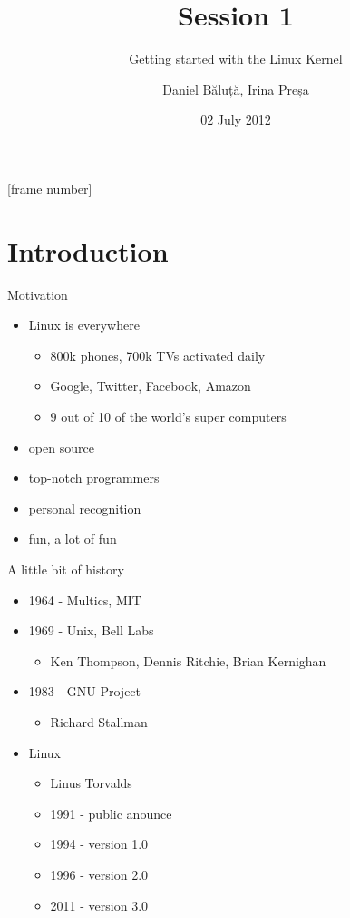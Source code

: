 \documentclass{workshop}
\title[Sesssion 1]{Session 1}
\subtitle{Getting started with the Linux Kernel}
\author{Daniel Băluță, Irina Preșa}
\date{02 July 2012}
\begin{document}
[frame number]

\frame{\titlepage}

\section{Introduction}

\begin{frame}{Motivation}
	\begin{itemize}
	\item Linux is everywhere
	\begin{itemize}
		\item 800k phones, 700k TVs activated daily
		\item Google, Twitter, Facebook, Amazon
		\item 9 out of 10 of the world's super computers
	\end{itemize}
	\item open source
	\item top-notch programmers
	\item personal recognition
	\item fun, a lot of fun
	\end{itemize}
\end{frame}

\begin{frame}{A little bit of history} 
	\begin{itemize}
	\item 1964 - Multics, MIT
	\item 1969 - Unix, Bell Labs
	\begin{itemize}
	\item Ken Thompson, Dennis Ritchie, Brian Kernighan
	\end{itemize}
	\item 1983 - GNU Project
	\begin{itemize}
	\item Richard Stallman
	\end{itemize}
	\item Linux 
	\begin{itemize}
	\item Linus Torvalds
	\item 1991 - public anounce 
	\item 1994 - version 1.0
	\item 1996 - version 2.0
	\item 2011 - version 3.0
	\end{itemize}
	\end{itemize}
\end{frame}
\end{document}
